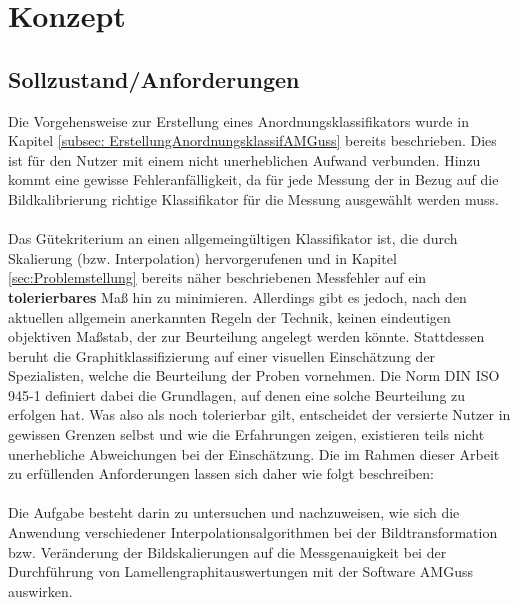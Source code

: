 \documentclass[
fontsize=10pt, 
listof = totoc,
parskip = half	
]{report}
\begin{document}
\chapter{Konzept}
\label{ch:Konzept}

\section{Sollzustand/Anforderungen}
\label{sec:DefAnforderungenAnordnKlas}
Die Vorgehensweise zur Erstellung eines Anordnungsklassifikators wurde in Kapitel \ref{subsec: ErstellungAnordnungsklassifAMGuss} bereits beschrieben. Dies ist für den Nutzer mit einem nicht unerheblichen Aufwand verbunden. Hinzu kommt eine gewisse Fehleranfälligkeit, da für jede Messung der in Bezug auf die Bildkalibrierung richtige Klassifikator für die Messung ausgewählt werden muss.
\\\\
\noindent Das Gütekriterium an einen allgemeingültigen Klassifikator ist, die durch Skalierung (bzw. Interpolation) hervorgerufenen und in Kapitel \ref{sec:Problemstellung} bereits näher beschriebenen Messfehler auf ein \textbf{tolerierbares} Maß hin zu minimieren. Allerdings gibt es jedoch, nach den aktuellen allgemein anerkannten Regeln der Technik, keinen eindeutigen objektiven Maßstab, der zur Beurteilung angelegt werden könnte. Stattdessen beruht die Graphitklassifizierung auf einer visuellen Einschätzung der Spezialisten, welche die Beurteilung der Proben vornehmen. Die Norm DIN ISO 945-1 definiert dabei die Grundlagen, auf denen eine solche Beurteilung zu erfolgen hat. Was also als noch tolerierbar gilt, entscheidet der versierte Nutzer in gewissen Grenzen selbst und wie die Erfahrungen zeigen, existieren teils nicht unerhebliche Abweichungen bei der Einschätzung. Die im Rahmen dieser Arbeit zu erfüllenden Anforderungen lassen sich daher wie folgt beschreiben:
\\\\
\noindent Die Aufgabe besteht darin zu untersuchen und nachzuweisen, wie sich die Anwendung verschiedener Interpolationsalgorithmen bei der Bildtransformation bzw. Veränderung der Bildskalierungen auf die Messgenauigkeit bei der Durchführung von Lamellengraphitauswertungen mit der Software AMGuss auswirken. 
\end{document}
